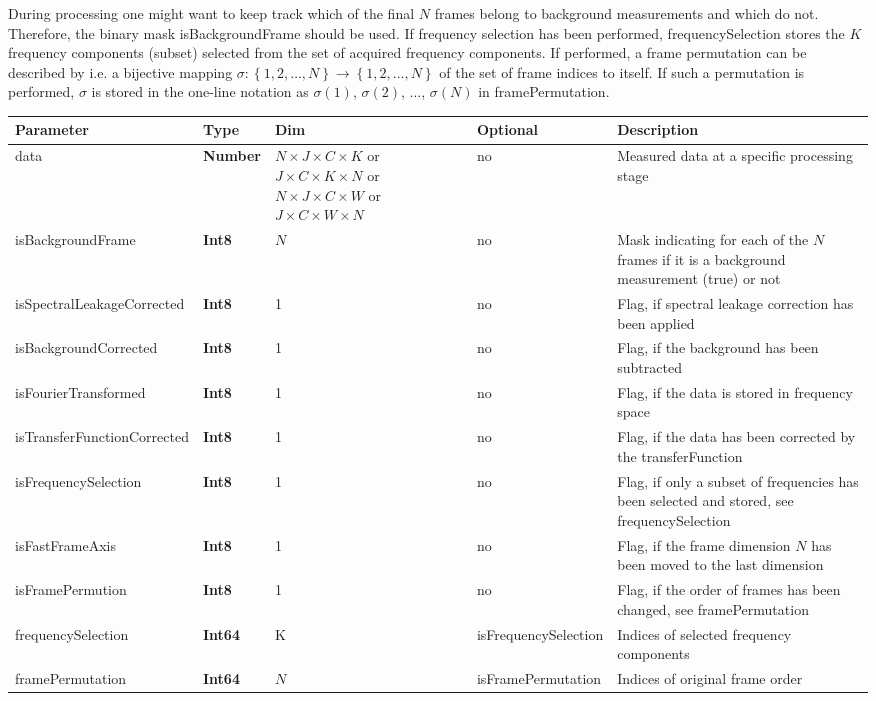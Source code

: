\documentclass[landscape,a4paper]{article} %
\newcommand{\inltab}[1]{{\ttfamily\bfseries\color{blue}#1}}
\newcommand{\inlvar}[1]{{\ttfamily#1}}
\begin{document}
\begin{multicols}{2}
During processing one might want to keep track which of the final $N$ frames belong to background measurements and which do not. Therefore, the binary mask \inlvar{isBackgroundFrame} should be used. If frequency selection has been performed, \inlvar{frequencySelection} stores the $K$ frequency components (subset) selected from the set of acquired frequency components. If performed, a frame permutation can be described by i.e. a bijective mapping $\sigma : \left\{ 1,2,\dots,N \right\} \rightarrow \left\{ 1,2,\dots,N \right\}$ of the set of frame indices to itself. If such a permutation is performed, $\sigma$ is stored in the one-line notation as $\sigma(1)$, $\sigma(2)$, $\dots$, $\sigma(N)$ in \inlvar{framePermutation}.

\end{multicols}

\noindent \begin{tabularx}{\columnwidth}{llp{3cm}lX} 
\textbf{Parameter} & \textbf{Type} & \textbf{Dim} &  \textbf{Optional} & \textbf{Description} \\ \hline 
\inlvar{data} & \inltab{Number} & $N \times J \times C \times K$ or $ J \times C \times K\times N$ or $N \times J \times C \times W$ or $ J \times C \times W \times N$ & no & Measured data at a specific processing stage \\ \hline
\inlvar{isBackgroundFrame} & \inltab{Int8} & $N$ & no & Mask indicating for each of the $N$ frames if it is a background measurement (true) or not \\ \hline
\inlvar{isSpectralLeakageCorrected} & \inltab{Int8} & 1 & no & Flag, if spectral leakage correction has been applied \\ \hline
\inlvar{isBackgroundCorrected} & \inltab{Int8} & 1 & no & Flag, if the background has been subtracted \\ \hline
\inlvar{isFourierTransformed} & \inltab{Int8} & 1 & no & Flag, if the data is stored in frequency space \\ \hline
\inlvar{isTransferFunctionCorrected} & \inltab{Int8} & 1 & no & Flag, if the data has been corrected by the \inlvar{transferFunction}\\ \hline 
\inlvar{isFrequencySelection} & \inltab{Int8} & 1 & no & Flag, if only a subset of frequencies has been selected and stored, see \inlvar{frequencySelection}\\ \hline 
\inlvar{isFastFrameAxis} & \inltab{Int8} & 1 & no & Flag, if the frame dimension $N$ has been moved to the last dimension\\ \hline
\inlvar{isFramePermution} & \inltab{Int8} & 1 & no & Flag, if the order of frames has been changed, see \inlvar{framePermutation} \\ \hline 
\inlvar{frequencySelection} & \inltab{Int64} & K & \inlvar{isFrequencySelection} & Indices of selected frequency components \\ \hline
\inlvar{framePermutation} & \inltab{Int64} & $N$ & \inlvar{isFramePermutation} & Indices of original frame order\\ \hline
\end{tabularx} 
\end{document}
